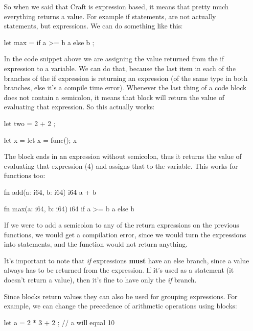 ﻿\documentclass[10pt,a4paper,twocolumn,twoside]{article}
\begin{document}
So when we said that Craft is expression based, it means that pretty much
everything returns a value. For example if statements, are not actually
statements, but expressions. We can do something like this:

\begin{code}
    let max = if a >= b { a } else { b };
\end{code}

In the code snippet above we are assigning the value returned from the if
expression to a variable. We can do that, because the last item in each of the
branches of the if expression is returning an expression (of the same type in
both branches, else it's a compile time error). Whenever the last thing of a
code block does not contain a semicolon, it means that block will return the
value of evaluating that expression. So this actually works: 

\begin{code}
    let two = {
        2 + 2
    };

    let x = {
        let x = func();
        x
    }
\end{code}

The block ends in an expression without semicolon, thus it returns the value of
evaluating that expression (4) and assigns that to the variable. This works for 
functions too:

\begin{code}
    fn add(a: i64, b: i64) i64 {
        a + b
    }

    fn max(a: i64, b: i64) i64 {
        if a >= b { a } else { b }
    }
\end{code}

If we were to add a semicolon to any of the return expressions on the previous
functions, we would get a compilation error, since we would turn the expressions
into statements, and the function would not return anything.

It's important to note that \textit{if} expressions \textbf{must} have an else
branch, since a value always has to be returned from the expression. If it's 
used as a statement (it doesn't return a value), then it's fine to have only the
\textit{if} branch.

Since blocks return values they can also be used for grouping expressions. For
example, we can change the precedence of arithmetic operations using blocks:

\begin{code}
    let a =  2 * { 3 + 2 }; // a will equal 10
\end{code}
\end{document}
